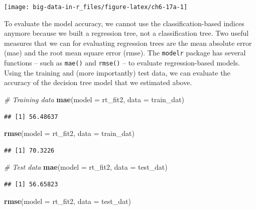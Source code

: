 \documentclass[]{book}
\newenvironment{Shaded}{\begin{snugshade}}{\end{snugshade}}
\newcommand{\CommentTok}[1]{\textcolor[rgb]{0.56,0.35,0.01}{\textit{#1}}}
\newcommand{\DataTypeTok}[1]{\textcolor[rgb]{0.13,0.29,0.53}{#1}}
\newcommand{\KeywordTok}[1]{\textcolor[rgb]{0.13,0.29,0.53}{\textbf{#1}}}
\newcommand{\NormalTok}[1]{#1}
\begin{document}
\texttt{[image: big-data-in-r\_files/figure-latex/ch6-17a-1]}

To evaluate the model accuracy, we cannot use the classification-based indices anymore because we built a regression tree, not a classification tree. Two useful measures that we can for evaluating regression trees are the mean absolute error (mae) and the root mean square error (rmse). The \texttt{modelr} package has several functions -- such as \texttt{mae()} and \texttt{rmse()} -- to evaluate regression-based models. Using the training and (more importantly) test data, we can evaluate the accuracy of the decision tree model that we estimated above.

\begin{Shaded}
\begin{Highlighting}[]
\CommentTok{# Training data}
\KeywordTok{mae}\NormalTok{(}\DataTypeTok{model =}\NormalTok{ rt_fit2, }\DataTypeTok{data =}\NormalTok{ train_dat)}
\end{Highlighting}
\end{Shaded}

\begin{verbatim}
## [1] 56.48637
\end{verbatim}

\begin{Shaded}
\begin{Highlighting}[]
\KeywordTok{rmse}\NormalTok{(}\DataTypeTok{model =}\NormalTok{ rt_fit2, }\DataTypeTok{data =}\NormalTok{ train_dat)}
\end{Highlighting}
\end{Shaded}

\begin{verbatim}
## [1] 70.3226
\end{verbatim}

\begin{Shaded}
\begin{Highlighting}[]
\CommentTok{# Test data}
\KeywordTok{mae}\NormalTok{(}\DataTypeTok{model =}\NormalTok{ rt_fit2, }\DataTypeTok{data =}\NormalTok{ test_dat)}
\end{Highlighting}
\end{Shaded}

\begin{verbatim}
## [1] 56.65823
\end{verbatim}

\begin{Shaded}
\begin{Highlighting}[]
\KeywordTok{rmse}\NormalTok{(}\DataTypeTok{model =}\NormalTok{ rt_fit2, }\DataTypeTok{data =}\NormalTok{ test_dat)}
\end{Highlighting}
\end{Shaded}
\end{document}
